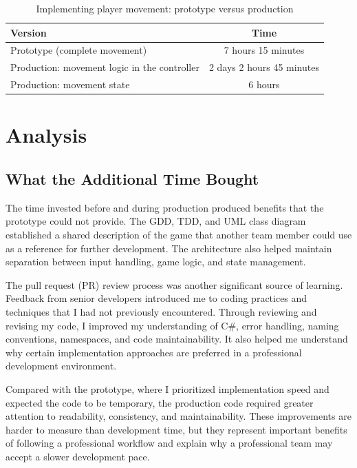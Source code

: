 \begin{table}[htbp]
    \centering
    \caption{Implementing player movement: prototype versus production}
    \label{tab:movement}
    \begin{tabular}{lc}
        \toprule
        \textbf{Version} & \textbf{Time} \\
        \midrule
        Prototype (complete movement) & 7 hours 15 minutes \\
        Production: movement logic in the controller & 2 days 2 hours 45 minutes \\
        Production: movement state & 6 hours \\
        \bottomrule
    \end{tabular}
\end{table}

\section{Analysis}

\subsection{What the Additional Time Bought}
The time invested before and during production produced benefits that the prototype could not provide. The GDD, TDD, and UML class diagram established a shared description of the game that another team member could use as a reference for further development. The architecture also helped maintain separation between input handling, game logic, and state management.

The pull request (PR) review process was another significant source of learning. Feedback from senior developers introduced me to coding practices and techniques that I had not previously encountered. Through reviewing and revising my code, I improved my understanding of C\#, error handling, naming conventions, namespaces, and code maintainability. It also helped me understand why certain implementation approaches are preferred in a professional development environment.

Compared with the prototype, where I prioritized implementation speed and expected the code to be temporary, the production code required greater attention to readability, consistency, and maintainability. These improvements are harder to measure than development time, but they represent important benefits of following a professional workflow and explain why a professional team may accept a slower development pace.

